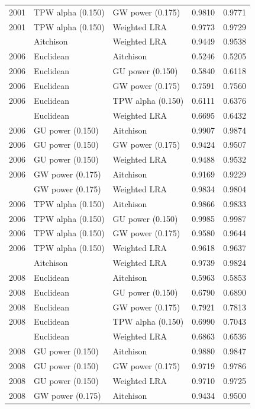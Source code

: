 \begin{longtable}[t]{rllrr}
2001 & TPW alpha (0.150) & GW power (0.175) & 0.9810 & 0.9771\\
2001 & TPW alpha (0.150) & Weighted LRA & 0.9773 & 0.9729\\
\addlinespace
2006 & Aitchison & Weighted LRA & 0.9449 & 0.9538\\
2006 & Euclidean & Aitchison & 0.5246 & 0.5205\\
2006 & Euclidean & GU power (0.150) & 0.5840 & 0.6118\\
2006 & Euclidean & GW power (0.175) & 0.7591 & 0.7560\\
2006 & Euclidean & TPW alpha (0.150) & 0.6111 & 0.6376\\
\addlinespace
2006 & Euclidean & Weighted LRA & 0.6695 & 0.6432\\
2006 & GU power (0.150) & Aitchison & 0.9907 & 0.9874\\
2006 & GU power (0.150) & GW power (0.175) & 0.9424 & 0.9507\\
2006 & GU power (0.150) & Weighted LRA & 0.9488 & 0.9532\\
2006 & GW power (0.175) & Aitchison & 0.9169 & 0.9229\\
\addlinespace
2006 & GW power (0.175) & Weighted LRA & 0.9834 & 0.9804\\
2006 & TPW alpha (0.150) & Aitchison & 0.9866 & 0.9833\\
2006 & TPW alpha (0.150) & GU power (0.150) & 0.9985 & 0.9987\\
2006 & TPW alpha (0.150) & GW power (0.175) & 0.9580 & 0.9644\\
2006 & TPW alpha (0.150) & Weighted LRA & 0.9618 & 0.9637\\
\addlinespace
2008 & Aitchison & Weighted LRA & 0.9739 & 0.9824\\
2008 & Euclidean & Aitchison & 0.5963 & 0.5853\\
2008 & Euclidean & GU power (0.150) & 0.6790 & 0.6890\\
2008 & Euclidean & GW power (0.175) & 0.7921 & 0.7813\\
2008 & Euclidean & TPW alpha (0.150) & 0.6990 & 0.7043\\
\addlinespace
2008 & Euclidean & Weighted LRA & 0.6863 & 0.6536\\
2008 & GU power (0.150) & Aitchison & 0.9880 & 0.9847\\
2008 & GU power (0.150) & GW power (0.175) & 0.9719 & 0.9786\\
2008 & GU power (0.150) & Weighted LRA & 0.9710 & 0.9725\\
2008 & GW power (0.175) & Aitchison & 0.9434 & 0.9500\\

\end{longtable}
